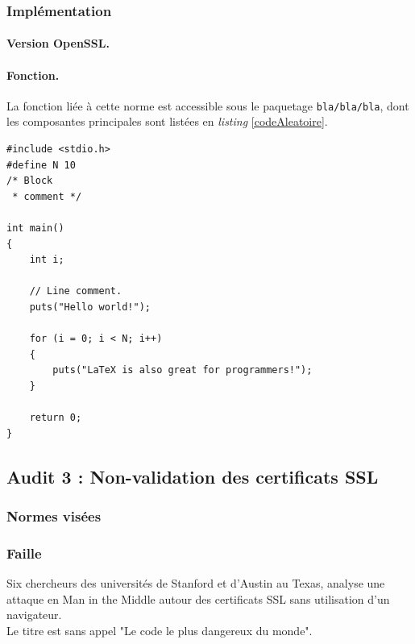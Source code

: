 		\subsubsection{Implémentation}
			
			\paragraph{Version OpenSSL.\\}
			
			\paragraph{Fonction.\\}
			La fonction liée à cette norme est accessible sous 
			le paquetage \texttt{bla/bla/bla}, dont les composantes 
			principales sont listées en \textit{listing} \ref{codeAleatoire}.
		
		
		\begin{lstlisting}[style=customc,caption=codeAleatoire.c, label=codeAleatoire]
#include <stdio.h>
#define N 10
/* Block
 * comment */
 
int main()
{
    int i;
 
    // Line comment.
    puts("Hello world!");
 
    for (i = 0; i < N; i++)
    {
        puts("LaTeX is also great for programmers!");
    }
 
    return 0;
}
		\end{lstlisting}
		
	\subsection{Audit 3 : Non-validation des certificats SSL}
		\subsubsection{Normes visées}
	
		\subsubsection{Faille}
		
			Six chercheurs des universités de Stanford et d'Austin au Texas, 
			analyse une attaque en Man in the Middle autour des certificats
			SSL sans utilisation d'un navigateur.\\
			
			Le titre est sans appel "Le code le plus dangereux du monde".\\
			
